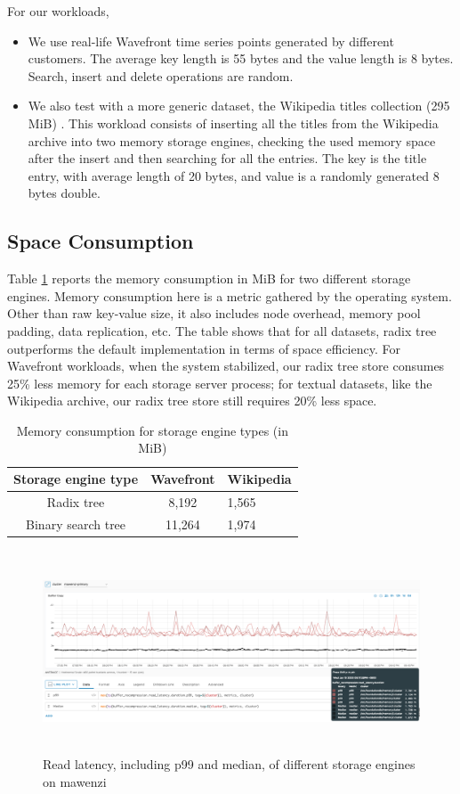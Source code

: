 \documentclass[sigplan,screen,nonacm]{acmart}
\begin{document}
For our workloads, 
\begin{itemize}
    \item We use real-life Wavefront time series points generated by different customers. The average key length is 55 bytes and the value length is 8 bytes. Search, insert and delete operations are random. 
    \item We also test with a more generic dataset, the Wikipedia titles collection (295 MiB) \cite{wikidatasets}. This workload consists of inserting all the titles from the Wikipedia archive into two memory storage engines, checking the used memory space after the insert and then searching for all the entries. The key is the title entry, with average length of 20 bytes, and value is a randomly generated 8 bytes double. 
\end{itemize}

\subsection{Space Consumption}
Table \ref{tab:memory-usage} reports the memory consumption in MiB for two different storage engines. Memory consumption here is a metric gathered by the operating system.  Other than raw key-value size, it also includes node overhead, memory pool padding, data replication, etc. The table shows that for all datasets, radix tree outperforms the default implementation in terms of space efficiency. For Wavefront workloads, when the system stabilized, our radix tree store consumes 25\% less memory for each storage server process; for textual datasets, like the Wikipedia archive, our radix tree store still requires 20\% less space. 

\begin{table}[h]
  \caption{Memory consumption for storage engine types (in MiB)}
  \begin{tabular}{ccl}
    \toprule
    Storage engine type&Wavefront&Wikipedia\\
    \midrule
    Radix tree & 8,192 & 1,565\\
    Binary search tree & 11,264 & 1,974\\
    \bottomrule
  \end{tabular}
  \label{tab:memory-usage}
\end{table}

\begin{figure}[t]
  \centering
  \includegraphics[width=\linewidth, height=6cm]{pic/read latency.png}
  \setlength{\belowcaptionskip}{-8pt} 
  \caption{Read latency, including p99 and median, of different storage engines on mawenzi}
  \label{fig:read-latency}
\end{figure}
\end{document}
